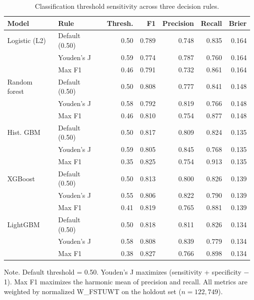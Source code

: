 \begin{table}[tb]
\centering
\small
\caption{Classification threshold sensitivity across three decision rules.\label{tab:threshold}}
\begin{tabular}{@{}llrrrrr@{}}
\toprule
\textbf{Model} & \textbf{Rule} & \textbf{Thresh.} & \textbf{F1} & \textbf{Precision} & \textbf{Recall} & \textbf{Brier} \\
\midrule
  Logistic (L2) & Default (0.50) & 0.50 & 0.789 & 0.748 & 0.835 & 0.164 \\
   & Youden's J & 0.59 & 0.774 & 0.787 & 0.760 & 0.164 \\
   & Max F1 & 0.46 & 0.791 & 0.732 & 0.861 & 0.164 \\
  \addlinespace
  Random forest & Default (0.50) & 0.50 & 0.808 & 0.777 & 0.841 & 0.148 \\
   & Youden's J & 0.58 & 0.792 & 0.819 & 0.766 & 0.148 \\
   & Max F1 & 0.46 & 0.810 & 0.754 & 0.877 & 0.148 \\
  \addlinespace
  Hist. GBM & Default (0.50) & 0.50 & 0.817 & 0.809 & 0.824 & 0.135 \\
   & Youden's J & 0.59 & 0.805 & 0.845 & 0.768 & 0.135 \\
   & Max F1 & 0.35 & 0.825 & 0.754 & 0.913 & 0.135 \\
  \addlinespace
  XGBoost & Default (0.50) & 0.50 & 0.813 & 0.800 & 0.826 & 0.139 \\
   & Youden's J & 0.55 & 0.806 & 0.822 & 0.790 & 0.139 \\
   & Max F1 & 0.41 & 0.819 & 0.765 & 0.881 & 0.139 \\
  \addlinespace
  LightGBM & Default (0.50) & 0.50 & 0.818 & 0.811 & 0.826 & 0.134 \\
   & Youden's J & 0.58 & 0.808 & 0.839 & 0.779 & 0.134 \\
   & Max F1 & 0.38 & 0.827 & 0.766 & 0.898 & 0.134 \\
\bottomrule
\end{tabular}
\begin{tablenotes}
\item Note. Default threshold = 0.50. Youden's J maximizes (sensitivity + specificity $-$ 1). Max F1 maximizes the harmonic mean of precision and recall. All metrics are weighted by normalized W\_FSTUWT on the holdout set ($n = 122{,}749$).
\end{tablenotes}
\end{table}
